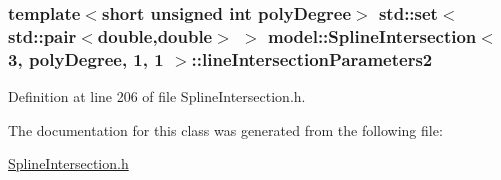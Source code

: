 \hypertarget{classmodel_1_1_spline_intersection_3_013_00_01poly_degree_00_011_00_011_01_4_ad540f302cf83a2e908ddbefb1f493591}{}
\subsubsection[{line\+Intersection\+Parameters2}]{\setlength{\rightskip}{0pt plus 5cm}template$<$short unsigned int poly\+Degree$>$ {\bf std\+::set}$<$std\+::pair$<$double,double$>$ $>$ {\bf model\+::\+Spline\+Intersection}$<$ 3, poly\+Degree, 1, 1 $>$\+::line\+Intersection\+Parameters2}\label{classmodel_1_1_spline_intersection_3_013_00_01poly_degree_00_011_00_011_01_4_ad540f302cf83a2e908ddbefb1f493591}


Definition at line 206 of file Spline\+Intersection.\+h.



The documentation for this class was generated from the following file\+:\begin{DoxyCompactItemize}
\item 
\hyperlink{_spline_intersection_8h}{Spline\+Intersection.\+h}\end{DoxyCompactItemize}
